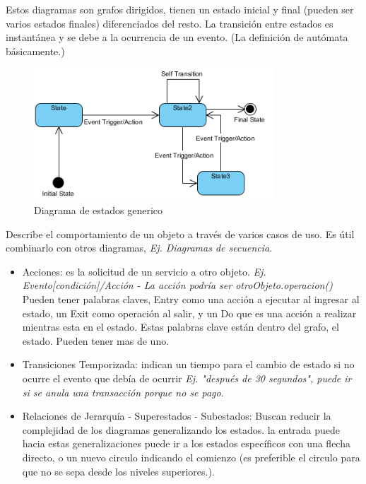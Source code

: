 \documentclass[titlepage,a4paper]{article}
\begin{document}
Estos diagramas son grafos dirigidos, tienen un estado inicial y final (pueden ser varios estados finales) diferenciados del resto. La transición entre estados es instantánea y se debe a la ocurrencia de un evento. (La definición de autómata básicamente.)

\begin{figure}[!htb]
    \centering
    \includegraphics[width=0.8\textwidth]{Imagenes/StateDiagram.png}
    \caption{Diagrama de estados generico}
\end{figure}

Describe el comportamiento de un objeto a través de varios casos de uso. Es útil combinarlo con otros diagramas, \textit{Ej. Diagramas de secuencia}.

\begin{itemize}
    \item Acciones: es la solicitud de un servicio a otro objeto. \textit{Ej. Evento[condición]/Acción - La acción podría ser otroObjeto.operacion()} Pueden tener palabras claves, Entry como una acción a ejecutar al ingresar al estado, un Exit como operación al salir, y un Do que es una acción a realizar mientras esta en el estado. Estas palabras clave están dentro del grafo, el estado. Pueden tener mas de uno.
    \item Transiciones Temporizada: indican un tiempo para el cambio de estado si no ocurre el evento que debía de ocurrir \textit{Ej. "después de 30 segundos", puede ir si se anula una transacción porque no se pago}.
    \item Relaciones de Jerarquía - Superestados - Subestados: Buscan reducir la complejidad de los diagramas generalizando los estados. la entrada puede hacia estas generalizaciones puede ir a los estados específicos con una flecha directo, o un nuevo circulo indicando el comienzo (es preferible el circulo para que no se sepa desde los niveles superiores.).
\end{itemize}
\end{document}
